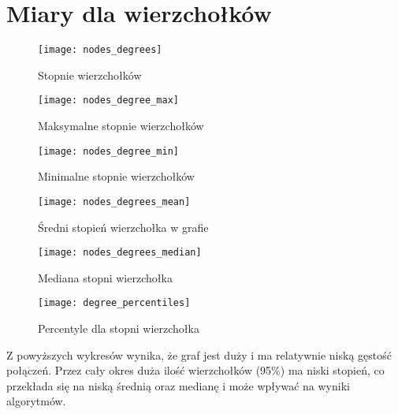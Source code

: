 \FloatBarrier
\section{Miary dla wierzchołków}
\begin{figure}[h]
	\centering
	\texttt{[image: nodes\_degrees]}
	\caption{Stopnie wierzchołków}
\end{figure}
\FloatBarrier
\FloatBarrier
\begin{figure}[h]
	\centering
	\texttt{[image: nodes\_degree\_max]}
	\caption{Maksymalne stopnie wierzchołków }
\end{figure}
\FloatBarrier
\FloatBarrier
\begin{figure}[h]
	\centering
	\texttt{[image: nodes\_degree\_min]}
	\caption{Minimalne stopnie wierzchołków}
\end{figure}
\FloatBarrier\FloatBarrier
\begin{figure}[h]
	\centering
	\texttt{[image: nodes\_degrees\_mean]}
	\caption{Średni stopień wierzchołka w grafie}
\end{figure}
\FloatBarrier\FloatBarrier
\begin{figure}[h]
	\centering
	\texttt{[image: nodes\_degrees\_median]}
	\caption{Mediana stopni wierzchołka}
\end{figure}
\FloatBarrier\FloatBarrier
\begin{figure}[h]
	\centering
	\texttt{[image: degree\_percentiles]}
	\caption{Percentyle dla stopni wierzchołka}
\end{figure}

Z powyższych wykresów wynika, że graf jest duży i ma relatywnie niską gęstość połączeń. Przez cały okres duża ilość wierzchołków (95\%) ma niski stopień, co przekłada się na niską średnią oraz medianę i może wpływać na wyniki algorytmów. 
\FloatBarrier\FloatBarrier
\newpage